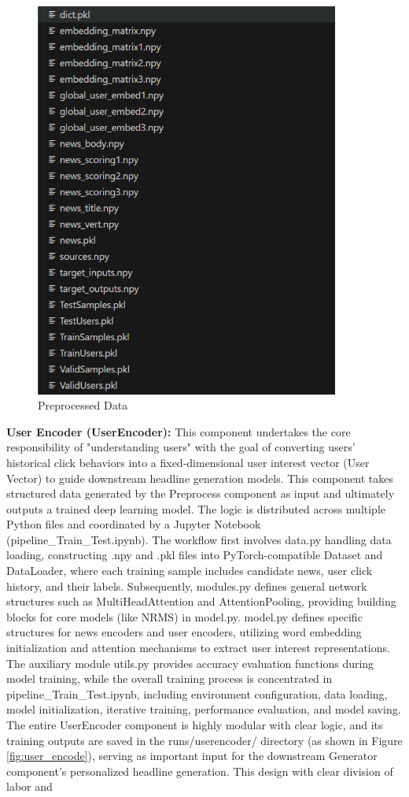 \documentclass[10pt,a4paper]{article}
\begin{document}
\begin{figure}[H]
  \centering
  \includegraphics[width=10cm]{fig/processed_data.png}
  \caption{Preprocessed Data}\label{fig:processed_data}
\end{figure}

\textbf{User Encoder (UserEncoder):}
This component undertakes the core responsibility of "understanding users" with the goal of converting users' historical click behaviors into a fixed-dimensional user interest vector (User Vector) to guide downstream headline generation models. This component takes structured data generated by the Preprocess component as input and ultimately outputs a trained deep learning model. The logic is distributed across multiple Python files and coordinated by a Jupyter Notebook (pipeline\_Train\_Test.ipynb). The workflow first involves data.py handling data loading, constructing .npy and .pkl files into PyTorch-compatible Dataset and DataLoader, where each training sample includes candidate news, user click history, and their labels. Subsequently, modules.py defines general network structures such as MultiHeadAttention and AttentionPooling, providing building blocks for core models (like NRMS) in model.py. model.py defines specific structures for news encoders and user encoders, utilizing word embedding initialization and attention mechanisms to extract user interest representations. The auxiliary module utils.py provides accuracy evaluation functions during model training, while the overall training process is concentrated in pipeline\_Train\_Test.ipynb, including environment configuration, data loading, model initialization, iterative training, performance evaluation, and model saving. The entire UserEncoder component is highly modular with clear logic, and its training outputs are saved in the runs/userencoder/ directory (as shown in Figure \ref{fig:user_encode}), serving as important input for the downstream Generator component's personalized headline generation. This design with clear division of labor and
\end{document}
